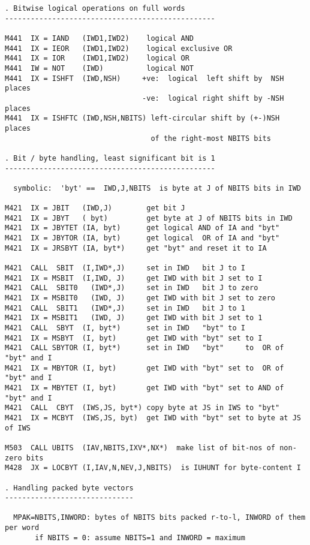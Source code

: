 \begin{verbatim}
. Bitwise logical operations on full words
-------------------------------------------------

M441  IX = IAND   (IWD1,IWD2)    logical AND
M441  IX = IEOR   (IWD1,IWD2)    logical exclusive OR
M441  IX = IOR    (IWD1,IWD2)    logical OR
M441  IW = NOT    (IWD)          logical NOT
M441  IX = ISHFT  (IWD,NSH)     +ve:  logical  left shift by  NSH places
                                -ve:  logical right shift by -NSH places
M441  IX = ISHFTC (IWD,NSH,NBITS) left-circular shift by (+-)NSH places
                                  of the right-most NBITS bits

. Bit / byte handling, least significant bit is 1
-------------------------------------------------

  symbolic:  'byt' ==  IWD,J,NBITS  is byte at J of NBITS bits in IWD

M421  IX = JBIT   (IWD,J)        get bit J
M421  IX = JBYT   ( byt)         get byte at J of NBITS bits in IWD
M421  IX = JBYTET (IA, byt)      get logical AND of IA and "byt"
M421  IX = JBYTOR (IA, byt)      get logical  OR of IA and "byt"
M421  IX = JRSBYT (IA, byt*)     get "byt" and reset it to IA

M421  CALL  SBIT  (I,IWD*,J)     set in IWD   bit J to I
M421  IX = MSBIT  (I,IWD, J)     get IWD with bit J set to I
M421  CALL  SBIT0   (IWD*,J)     set in IWD   bit J to zero
M421  IX = MSBIT0   (IWD, J)     get IWD with bit J set to zero
M421  CALL  SBIT1   (IWD*,J)     set in IWD   bit J to 1
M421  IX = MSBIT1   (IWD, J)     get IWD with bit J set to 1
M421  CALL  SBYT  (I, byt*)      set in IWD   "byt" to I
M421  IX = MSBYT  (I, byt)       get IWD with "byt" set to I
M421  CALL SBYTOR (I, byt*)      set in IWD   "byt"     to  OR of "byt" and I
M421  IX = MBYTOR (I, byt)       get IWD with "byt" set to  OR of "byt" and I
M421  IX = MBYTET (I, byt)       get IWD with "byt" set to AND of "byt" and I
M421  CALL  CBYT  (IWS,JS, byt*) copy byte at JS in IWS to "byt"
M421  IX = MCBYT  (IWS,JS, byt)  get IWD with "byt" set to byte at JS of IWS

M503  CALL UBITS  (IAV,NBITS,IXV*,NX*)  make list of bit-nos of non-zero bits
M428  JX = LOCBYT (I,IAV,N,NEV,J,NBITS)  is IUHUNT for byte-content I

. Handling packed byte vectors
------------------------------

  MPAK=NBITS,INWORD: bytes of NBITS bits packed r-to-l, INWORD of them per word
       if NBITS = 0: assume NBITS=1 and INWORD = maximum


\end{verbatim}
